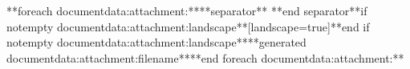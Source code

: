 \documentclass{scrartcl}
\begin{document}


	
	**foreach documentdata:attachment:****separator** **end separator**\*if notempty documentdata:attachment:landscape**[landscape=true]**end if notempty documentdata:attachment:landscape**{**generated documentdata:attachment:filename**}**end foreach documentdata:attachment:**
\end{document}
